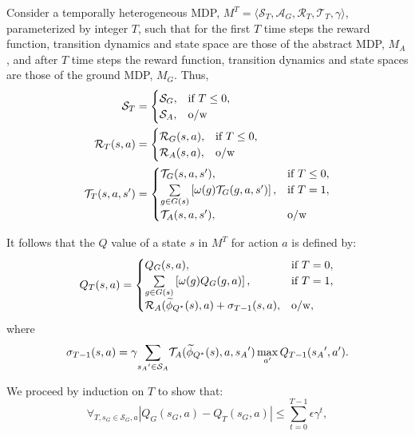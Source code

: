 Consider a temporally heterogeneous \ac{MDP}, $M^T = \langle \mathcal{S}_T, \mathcal{A}_G, \mathcal{R}_T, \mathcal{T}_T, \gamma \rangle$, parameterized by integer $T$, such that for the first $T$ time steps the reward function, transition dynamics and state space are those of the abstract MDP, $M_A$, and after $T$ time steps the reward function, transition dynamics and state spaces are those of the ground MDP, $M_G$. Thus,
\begin{align*}
\mathcal{S}_T &= \begin{cases}
\mathcal{S}_G,& \text{if } T \leq 0, \\
\mathcal{S}_A,& \text{o/w}
\end{cases}\\
\mathcal{R}_T(s,a) &= \begin{cases}
\mathcal{R}_G(s,a),& \text{if } T \leq 0, \\
\mathcal{R}_A(s, a),& \text{o/w}
\end{cases}\\
\mathcal{T}_T(s,a,s') &= \begin{cases}
\mathcal{T}_G(s,a,s'),& \text{if }T \leq 0, \\
\underset{{g \in G(s)}}{\sum}\left[\omega(g)\mathcal{T}_G(g, a, s')\right],& \text{if } T = 1, \\
\mathcal{T}_A(s,a,s'),& \text{o/w}
\end{cases}\\
\end{align*}

It follows that the $Q$ value of a state $s$ in $M^T$ for action $a$ is defined by:
\begin{equation}
Q_T(s, a) = 
\begin{cases}
	   Q_G(s, a), &  \text{if } T=0,\\
	   \underset{g \in G(s)}{\sum} \left[ \omega(g)Q_G(g,a) \right], & \text{if } T = 1,\\
	   \mathcal{R}_A(\widetilde \phi_{Q^*}(s),a) + \sigma_{T-1}(s,a), &\text{o/w},
\end{cases}
\end{equation}
where
\begin{equation}
\sigma_{T-1}(s,a) = \gamma \underset{{s_A}' \in \mathcal{S}_A}{\sum} \mathcal{T}_A(\widetilde \phi_{Q^*}(s),a,{s_A}') \max_{a'} Q_{T-1}({s_A}', a').
\end{equation}

We proceed by induction on $T$ to show that:
\begin{equation}
\forall_{T, s_G \in \mathcal{S}_G, a} |Q_G(s_G, a) - Q_T(s_G, a)| \leq \sum_{t=0}^{T-1} \epsilon \gamma^{t},
\end{equation}

